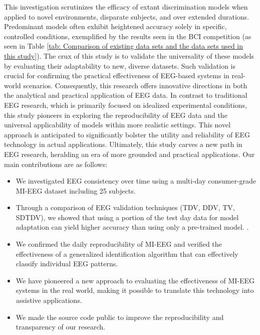 \vspace{3mm}
This investigation scrutinizes the efficacy of extant discrimination models
when applied to novel environments, disparate subjects, and over extended
durations. Predominant models often exhibit heightened accuracy solely in specific,
controlled conditions, exemplified by the results seen in the BCI competition
(as seen in Table \ref{tab: Comparison of existing data sets and the data sets used in this study}). The crux of this study is to validate the universality
of these models by evaluating their adaptability to new, diverse datasets.
Such validation is crucial for confirming the practical effectiveness of EEG-based
systems in real-world scenarios. Consequently, this research offers
innovative directions in both the analytical and practical application of
EEG data. In contrast to traditional EEG research, which is primarily focused on
idealized experimental conditions, this study pioneers in exploring the reproducibility
of EEG data and the universal applicability of models within more realistic settings.
This novel approach is anticipated to significantly bolster the utility and
reliability of EEG technology in actual applications. Ultimately, this study
carves a new path in EEG research, heralding an era of more grounded and practical
applications. Our main contributions are as follows:
\begin{itemize}
    \vspace{1mm}
    \item We investigated EEG consistency over time using a multi-day consumer-grade MI-EEG dataset including 25 subjects.
    \vspace{3mm}
    \item Through a comparison of EEG validation techniques (TDV, DDV, TV, SDTDV), we showed that using a portion of the test day data for model adaptation can yield higher accuracy than using only a pre-trained model. .
    \vspace{3mm}
    \item We confirmed the daily reproducibility of MI-EEG and verified the effectiveness of a generalized identification algorithm that can effectively classify individual EEG patterns.
    \vspace{3mm}
    \item We have pioneered a new approach to evaluating the effectiveness of MI-EEG systems in the real world, making it possible to translate this technology into assistive applications.
    \vspace{3mm}
    \item We made the source code public to improve the reproducibility and transparency of our research.
\end{itemize}
